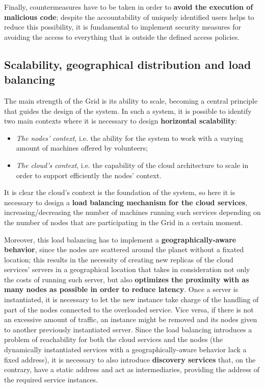 Finally, countermeasures have to be taken in order to \textbf{avoid the execution of malicious code}; despite the accountability of uniquely identified users helps to reduce this possibility, it is fundamental to implement security measures for avoiding the access to everything that is outside the defined access policies.

\subsection{Scalability, geographical distribution and load balancing}\label{scalabilitu_geographical_distribution_and_load_balancing}
The main strength of the Grid is its ability to scale, becoming a central principle that guides the design of the system. In such a system, it is possible to identify two main contexts where it is necessary to design \textbf{horizontal scalability}:
\vspace{5mm}
\begin{itemize}
    \item \textit{The nodes' context}, i.e. the ability for the system to work with a varying amount of machines offered by volunteers;
    \item \textit{The cloud's context}, i.e. the capability of the cloud architecture to scale in order to support efficiently the nodes' context.
\end{itemize}

It is clear the cloud's context is the foundation of the system, so here it is necessary to design a \textbf{load balancing mechanism for the cloud services}, increasing/decreasing the number of machines running such services depending on the number of nodes that are participating in the Grid in a certain moment.

Moreover, this load balancing has to implement a \textbf{geographically-aware behavior}, since the nodes are scattered around the planet without a fixated location; this results in the necessity of creating new replicas of the cloud services' servers in a geographical location that takes in consideration not only the costs of running such server, but also \textbf{optimizes the proximity with as many nodes as possible in order to reduce latency}. Once a server is instantiated, it is necessary to let the new instance take charge of the handling of part of the nodes connected to the overloaded service. Vice versa, if there is not an excessive amount of traffic, an instance might be removed and its nodes given to another previously instantiated server.
Since the load balancing introduces a problem of reachability for both the cloud services and the nodes (the dynamically instantiated services with a geographically-aware behavior lack a fixed address), it is necessary to also introduce \textbf{discovery services} that, on the contrary, have a static address and act as intermediaries, providing the address of the required service instances.

